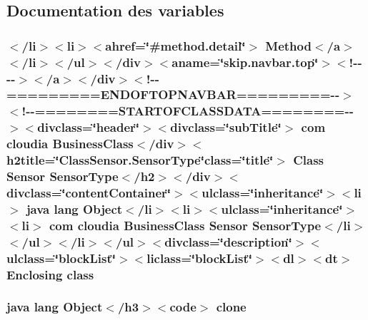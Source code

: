 \subsection{Documentation des variables}
\hypertarget{_sensor_8_sensor_type_8html_aa2e638228f892ad443296b457e9d60b1}{
\subsubsection[{class}]{\setlength{\rightskip}{0pt plus 5cm}$<$/li$>$$<$li$>$$<$ahref=\char`\"{}\#method.\-detail\char`\"{}$>$ Method$<$/{\bf a}$>$$<$/li$>$$<$/ul$>$$<$/div$>$$<$aname=\char`\"{}skip.\-navbar.\-top\char`\"{}$>$$<$!-\/-\/-\/-\/$>$$<$/a$>$$<$/div$>$$<$!-\/-\/=========E\-N\-D\-O\-F\-T\-O\-P\-N\-A\-V\-B\-A\-R=========-\/-\/$>$$<$!-\/-\/========S\-T\-A\-R\-T\-O\-F\-C\-L\-A\-S\-S\-D\-A\-T\-A========-\/-\/$>$$<$divclass=\char`\"{}header\char`\"{}$>$$<$divclass=\char`\"{}sub\-Title\char`\"{}$>$ com cloudia Business\-Class$<$/div$>$$<$h2title=\char`\"{}Class\-Sensor.\-Sensor\-Type\char`\"{}class=\char`\"{}title\char`\"{}$>$ Class {\bf Sensor} {\bf Sensor\-Type}$<$/h2$>$$<$/div$>$$<$divclass=\char`\"{}content\-Container\char`\"{}$>$$<$ulclass=\char`\"{}inheritance\char`\"{}$>$$<$li$>$ java lang Object$<$/li$>$$<$li$>$$<$ulclass=\char`\"{}inheritance\char`\"{}$>$$<$li$>$ com cloudia Business\-Class {\bf Sensor} {\bf Sensor\-Type}$<$/li$>$$<$/ul$>$$<$/li$>$$<$/ul$>$$<$divclass=\char`\"{}description\char`\"{}$>$$<$ulclass=\char`\"{}block\-List\char`\"{}$>$$<$liclass=\char`\"{}block\-List\char`\"{}$>$$<$dl$>$$<${\bf dt}$>$ Enclosing class}}\label{_sensor_8_sensor_type_8html_aa2e638228f892ad443296b457e9d60b1}
\hypertarget{_sensor_8_sensor_type_8html_adc9607fcabf6f2d7f401ad52015ef6e0}{
\subsubsection[{clone}]{\setlength{\rightskip}{0pt plus 5cm}java lang Object$<$/h3$>$$<$code$>$ clone}}\label{_sensor_8_sensor_type_8html_adc9607fcabf6f2d7f401ad52015ef6e0}
